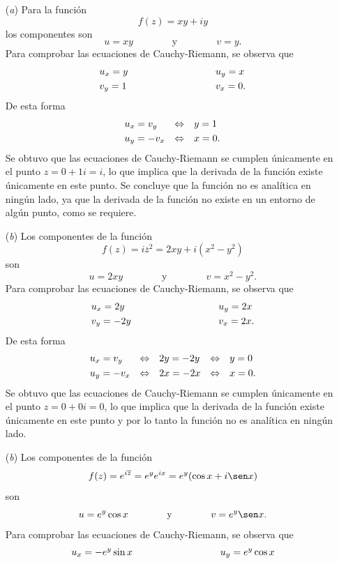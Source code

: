 \documentclass[a4paper]{report}
\begin{document}
\begin{enumerate}
 \item[(\textit{a})] Para la función 
 \[
  f(z)=xy+iy
 \]
 los componentes son 
 \[
  u=xy
  \qquad\qquad\textrm{y}\qquad\qquad
  v=y.
 \]
 Para comprobar las ecuaciones de Cauchy-Riemann, se observa que 
 \[
 \begin{array}{ll}
  u_x=y\qquad\qquad\qquad\qquad&u_y=x\\[\smallskipamount]
  v_y=1\qquad\qquad\qquad\qquad&v_x=0.
 \end{array}
 \]
 De esta forma
 \[
 \begin{array}{lll}
  u_x=v_y&\Leftrightarrow&y=1\\[\smallskipamount]
  u_y=-v_x&\Leftrightarrow&x=0.
 \end{array}
 \] 
 Se obtuvo que las ecuaciones de Cauchy-Riemann se cumplen únicamente en el punto \(z=0+1i=i\), lo que implica que la derivada de la función existe únicamente en este punto. Se concluye que la función no es analítica en ningún lado, ya que la derivada de la función no existe en un entorno de algún punto, como se requiere.
  \item[(\textit{b})] Los componentes de la función 
 \[
  f(z)=i\overline{z}^2=2xy+i(x^2-y^2)
 \]
 son 
 \[
  u=2xy
  \qquad\qquad\textrm{y}\qquad\qquad
  v=x^2-y^2.
 \]
 Para comprobar las ecuaciones de Cauchy-Riemann, se observa que 
 \[
 \begin{array}{ll}
  u_x=2y\qquad\qquad\qquad\qquad&u_y=2x\\[\smallskipamount]
  v_y=-2y\qquad\qquad\qquad\qquad&v_x=2x.
 \end{array}
 \]
 De esta forma
 \[
 \begin{array}{lllll}
  u_x=v_y&\Leftrightarrow&2y=-2y&\Leftrightarrow&y=0\\[\smallskipamount]
  u_y=-v_x&\Leftrightarrow&2x=-2x&\Leftrightarrow&x=0.
 \end{array}
 \] 
 Se obtuvo que las ecuaciones de Cauchy-Riemann se cumplen únicamente en el punto \(z=0+0i=0\), lo que implica que la derivada de la función existe únicamente en este punto y por lo tanto la función no es analítica en ningún lado.
  \item[(\textit{b})] Los componentes de la función 
 \[
  f(z)=e^{i\overline{z}}=e^{y}e^{ix}=e^y(\cos x+i\sen x)
 \]
 son 
 \[
  u=e^y\cos x
  \qquad\qquad\textrm{y}\qquad\qquad
  v=e^y\sen x.
 \]
 Para comprobar las ecuaciones de Cauchy-Riemann, se observa que 
 \[
 \begin{array}{ll}
  u_x=-e^y\sin x\qquad\qquad\qquad\qquad&u_y=e^y\cos x\\[\smallskipamount]

\end{array}\]
\end{enumerate}
\end{document}
